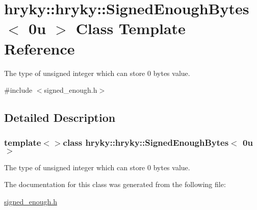 \hypertarget{classhryky_1_1hryky_1_1_signed_enough_bytes_3_010u_01_4}{\section{hryky\-:\-:hryky\-:\-:Signed\-Enough\-Bytes$<$ 0u $>$ Class Template Reference}
\label{classhryky_1_1hryky_1_1_signed_enough_bytes_3_010u_01_4}
}


The type of unsigned integer which can store 0 bytes value.  




{\ttfamily \#include $<$signed\-\_\-enough.\-h$>$}



\subsection{Detailed Description}
\subsubsection*{template$<$$>$class hryky\-::hryky\-::\-Signed\-Enough\-Bytes$<$ 0u $>$}

The type of unsigned integer which can store 0 bytes value. 

The documentation for this class was generated from the following file\-:\begin{DoxyCompactItemize}
\item 
\hyperlink{signed__enough_8h}{signed\-\_\-enough.\-h}\end{DoxyCompactItemize}
